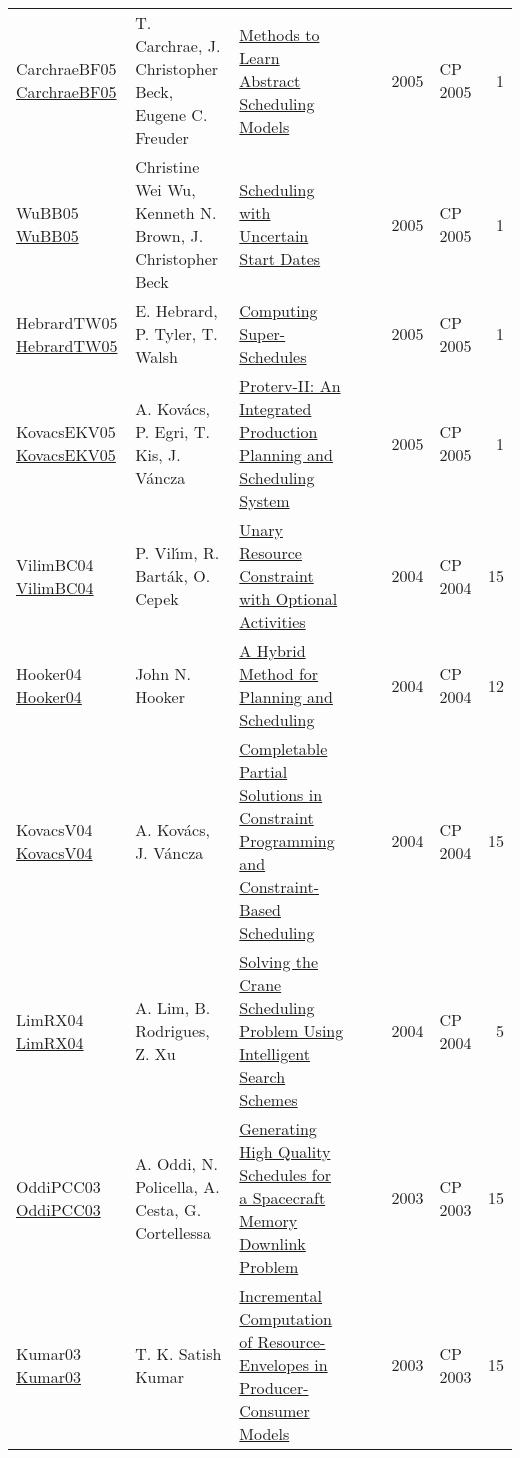 {\begin{longtable}{p{3cm}p{6cm}p{7cm}rrrp{3cm}r}
CarchraeBF05 \href{https://doi.org/10.1007/11564751\_80}{CarchraeBF05} & T. Carchrae, J. Christopher Beck, Eugene C. Freuder & \href{papers/CarchraeBF05.pdf}{Methods to Learn Abstract Scheduling Models} &  & \cite{CarchraeBF05} & 2005 & CP 2005 & 1\\
WuBB05 \href{https://doi.org/10.1007/11564751\_110}{WuBB05} & Christine Wei Wu, Kenneth N. Brown, J. Christopher Beck & \href{papers/WuBB05.pdf}{Scheduling with Uncertain Start Dates} &  & \cite{WuBB05} & 2005 & CP 2005 & 1\\
HebrardTW05 \href{https://doi.org/10.1007/11564751\_117}{HebrardTW05} & E. Hebrard, P. Tyler, T. Walsh & \href{papers/HebrardTW05.pdf}{Computing Super-Schedules} &  & \cite{HebrardTW05} & 2005 & CP 2005 & 1\\
KovacsEKV05 \href{https://doi.org/10.1007/11564751\_118}{KovacsEKV05} & A. Kov{\'{a}}cs, P. Egri, T. Kis, J. V{\'{a}}ncza & \href{papers/KovacsEKV05.pdf}{Proterv-II: An Integrated Production Planning and Scheduling System} &  & \cite{KovacsEKV05} & 2005 & CP 2005 & 1\\
VilimBC04 \href{https://doi.org/10.1007/978-3-540-30201-8\_8}{VilimBC04} & P. Vil{\'{\i}}m, R. Bart{\'{a}}k, O. Cepek & \href{papers/VilimBC04.pdf}{Unary Resource Constraint with Optional Activities} &  & \cite{VilimBC04} & 2004 & CP 2004 & 15\\
Hooker04 \href{https://doi.org/10.1007/978-3-540-30201-8\_24}{Hooker04} & John N. Hooker & \href{papers/Hooker04.pdf}{A Hybrid Method for Planning and Scheduling} &  & \cite{Hooker04} & 2004 & CP 2004 & 12\\
KovacsV04 \href{https://doi.org/10.1007/978-3-540-30201-8\_26}{KovacsV04} & A. Kov{\'{a}}cs, J. V{\'{a}}ncza & \href{papers/KovacsV04.pdf}{Completable Partial Solutions in Constraint Programming and Constraint-Based Scheduling} &  & \cite{KovacsV04} & 2004 & CP 2004 & 15\\
LimRX04 \href{https://doi.org/10.1007/978-3-540-30201-8\_59}{LimRX04} & A. Lim, B. Rodrigues, Z. Xu & \href{papers/LimRX04.pdf}{Solving the Crane Scheduling Problem Using Intelligent Search Schemes} &  & \cite{LimRX04} & 2004 & CP 2004 & 5\\
OddiPCC03 \href{https://doi.org/10.1007/978-3-540-45193-8\_39}{OddiPCC03} & A. Oddi, N. Policella, A. Cesta, G. Cortellessa & \href{papers/OddiPCC03.pdf}{Generating High Quality Schedules for a Spacecraft Memory Downlink Problem} &  & \cite{OddiPCC03} & 2003 & CP 2003 & 15\\
Kumar03 \href{https://doi.org/10.1007/978-3-540-45193-8\_45}{Kumar03} & T. K. Satish Kumar & \href{papers/Kumar03.pdf}{Incremental Computation of Resource-Envelopes in Producer-Consumer Models} &  & \cite{Kumar03} & 2003 & CP 2003 & 15\\

\end{longtable}}
